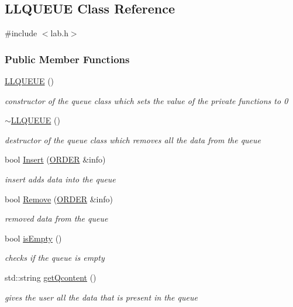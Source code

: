 \hypertarget{classLLQUEUE}{\subsection{L\+L\+Q\+U\+E\+U\+E Class Reference}
\label{classLLQUEUE}
}


{\ttfamily \#include $<$lab.\+h$>$}

\subsubsection*{Public Member Functions}
\begin{DoxyCompactItemize}
\item 
\hyperlink{classLLQUEUE_a228f05ff67aeb119b3bfbe0bbb194b20}{L\+L\+Q\+U\+E\+U\+E} ()
\begin{DoxyCompactList}\small\item\em constructor of the queue class which sets the value of the private functions to 0 \end{DoxyCompactList}\item 
\hyperlink{classLLQUEUE_a2ae375ef2a7ee584da27b7aa5ef0b4e8}{$\sim$\+L\+L\+Q\+U\+E\+U\+E} ()
\begin{DoxyCompactList}\small\item\em destructor of the queue class which removes all the data from the queue \end{DoxyCompactList}\item 
bool \hyperlink{classLLQUEUE_a2d53817739f7c273a3c0f14f7804c065}{Insert} (\hyperlink{structORDER}{O\+R\+D\+E\+R} \&info)
\begin{DoxyCompactList}\small\item\em insert adds data into the queue \end{DoxyCompactList}\item 
bool \hyperlink{classLLQUEUE_ab8d52943d24188adf0855a0ee9fa0afe}{Remove} (\hyperlink{structORDER}{O\+R\+D\+E\+R} \&info)
\begin{DoxyCompactList}\small\item\em removed data from the queue \end{DoxyCompactList}\item 
bool \hyperlink{classLLQUEUE_acf5810657663dfbb5ac62407bd78950c}{is\+Empty} ()
\begin{DoxyCompactList}\small\item\em checks if the queue is empty \end{DoxyCompactList}\item 
std\+::string \hyperlink{classLLQUEUE_a0e9bffdcd903a132b8f7899ccdbc0315}{get\+Qcontent} ()
\begin{DoxyCompactList}\small\item\em gives the user all the data that is present in the queue \end{DoxyCompactList}\end{DoxyCompactItemize}


